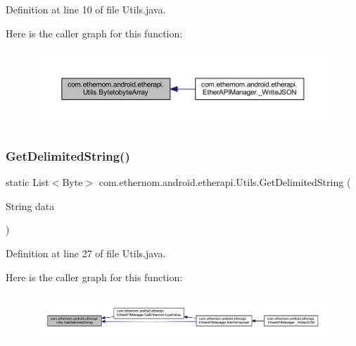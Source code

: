 Definition at line 10 of file Utils.\+java.

Here is the caller graph for this function\+:\nopagebreak
\begin{figure}[H]
\begin{center}
\leavevmode
\includegraphics[width=350pt]{classcom_1_1ethernom_1_1android_1_1etherapi_1_1_utils_acb76bf0189f4655b3405298263a1e1f2_icgraph}
\end{center}
\end{figure}
\mbox{\label{classcom_1_1ethernom_1_1android_1_1etherapi_1_1_utils_a7fdfdf6496150b6b9b12ed214796f84a}} 
\subsubsection{\texorpdfstring{Get\+Delimited\+String()}{GetDelimitedString()}}
{\footnotesize\ttfamily static List$<$Byte$>$ com.\+ethernom.\+android.\+etherapi.\+Utils.\+Get\+Delimited\+String (\begin{DoxyParamCaption}\item[{String}]{data }\end{DoxyParamCaption})\hspace{0.3cm}{\ttfamily [static]}}



Definition at line 27 of file Utils.\+java.

Here is the caller graph for this function\+:
\nopagebreak
\begin{figure}[H]
\begin{center}
\leavevmode
\includegraphics[width=350pt]{classcom_1_1ethernom_1_1android_1_1etherapi_1_1_utils_a7fdfdf6496150b6b9b12ed214796f84a_icgraph}
\end{center}
\end{figure}
\mbox{\label{classcom_1_1ethernom_1_1android_1_1etherapi_1_1_utils_a5ba18811e4d78758336b140c58f2683f}} 

